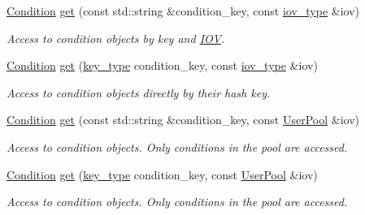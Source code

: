 \begin{DoxyCompactItemize}
\hyperlink{class_d_d4hep_1_1_conditions_1_1_condition}{Condition} \hyperlink{class_d_d4hep_1_1_conditions_1_1_container_a7ccceb3f6d41df13376c8c7988ab4735}{get} (const std::string \&condition\_\-key, const \hyperlink{class_d_d4hep_1_1_i_o_v}{iov\_\-type} \&iov)
\begin{DoxyCompactList}\small\item\em Access to condition objects by key and \hyperlink{class_d_d4hep_1_1_i_o_v}{IOV}. \item\end{DoxyCompactList}\item 
\hyperlink{class_d_d4hep_1_1_conditions_1_1_condition}{Condition} \hyperlink{class_d_d4hep_1_1_conditions_1_1_container_a1b9bfc1fd9fbb6953f1b1cf682263cc5}{get} (\hyperlink{class_d_d4hep_1_1_conditions_1_1_container_a65e62d9e4a43b9b0e9e46a7b80876a21}{key\_\-type} condition\_\-key, const \hyperlink{class_d_d4hep_1_1_i_o_v}{iov\_\-type} \&iov)
\begin{DoxyCompactList}\small\item\em Access to condition objects directly by their hash key. \item\end{DoxyCompactList}\item 
\hyperlink{class_d_d4hep_1_1_conditions_1_1_condition}{Condition} \hyperlink{class_d_d4hep_1_1_conditions_1_1_container_a8ebd515fda282d4269ee2fb72e65481b}{get} (const std::string \&condition\_\-key, const \hyperlink{class_d_d4hep_1_1_conditions_1_1_user_pool}{UserPool} \&iov)
\begin{DoxyCompactList}\small\item\em Access to condition objects. Only conditions in the pool are accessed. \item\end{DoxyCompactList}\item 
\hyperlink{class_d_d4hep_1_1_conditions_1_1_condition}{Condition} \hyperlink{class_d_d4hep_1_1_conditions_1_1_container_a6364c939553b81e4c5e05ac98d7f01a0}{get} (\hyperlink{class_d_d4hep_1_1_conditions_1_1_container_a65e62d9e4a43b9b0e9e46a7b80876a21}{key\_\-type} condition\_\-key, const \hyperlink{class_d_d4hep_1_1_conditions_1_1_user_pool}{UserPool} \&iov)
\begin{DoxyCompactList}\small\item\em Access to condition objects. Only conditions in the pool are accessed. \item\end{DoxyCompactList}\end{DoxyCompactItemize}


